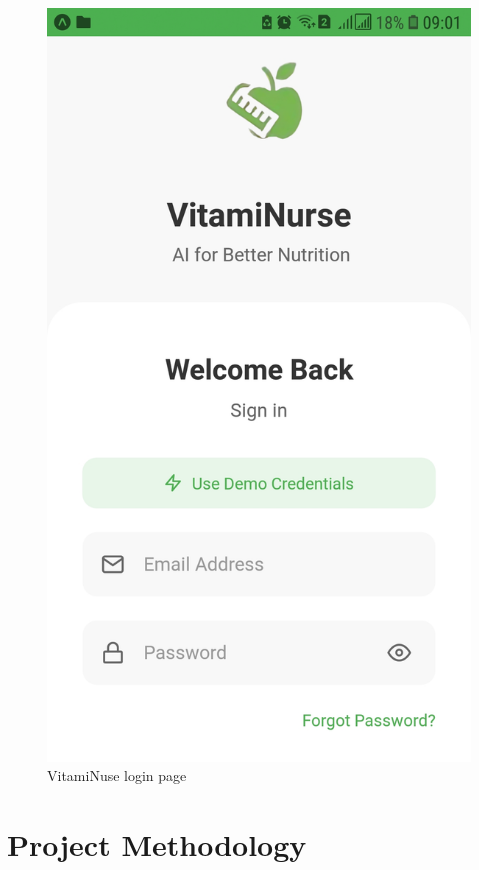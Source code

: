 \begin{center}
\begin{figure}[H]
            \centering
            \includegraphics[scale=0.11]{images/VN_AI_solution.jpg}
            \caption{VitamiNuse login page} 
            \label{fig:The AI powered app : VitamiNurse}
        \end{figure}
\end{center}


\section{Project Methodology}

